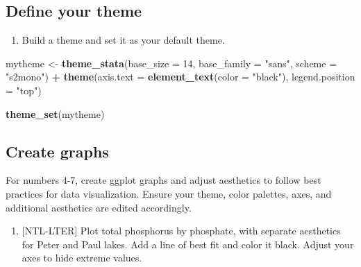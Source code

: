 \documentclass[]{article}
\newenvironment{Shaded}{\begin{snugshade}}{\end{snugshade}}
\newcommand{\DataTypeTok}[1]{\textcolor[rgb]{0.13,0.29,0.53}{#1}}
\newcommand{\DecValTok}[1]{\textcolor[rgb]{0.00,0.00,0.81}{#1}}
\newcommand{\KeywordTok}[1]{\textcolor[rgb]{0.13,0.29,0.53}{\textbf{#1}}}
\newcommand{\NormalTok}[1]{#1}
\newcommand{\OperatorTok}[1]{\textcolor[rgb]{0.81,0.36,0.00}{\textbf{#1}}}
\newcommand{\StringTok}[1]{\textcolor[rgb]{0.31,0.60,0.02}{#1}}
\providecommand{\tightlist}{%
  \setlength{\itemsep}{0pt}\setlength{\parskip}{0pt}}
\begin{document}
\hypertarget{define-your-theme}{%
\subsection{Define your theme}\label{define-your-theme}}

\begin{enumerate}
\def\labelenumi{\arabic{enumi}.}
\setcounter{enumi}{2}
\tightlist
\item
  Build a theme and set it as your default theme.
\end{enumerate}

\begin{Shaded}
\begin{Highlighting}[]
\NormalTok{mytheme <-}\StringTok{ }\KeywordTok{theme_stata}\NormalTok{(}\DataTypeTok{base_size =} \DecValTok{14}\NormalTok{, }\DataTypeTok{base_family =} \StringTok{"sans"}\NormalTok{, }\DataTypeTok{scheme =} \StringTok{"s2mono"}\NormalTok{) }\OperatorTok{+}
\StringTok{  }\KeywordTok{theme}\NormalTok{(}\DataTypeTok{axis.text =} \KeywordTok{element_text}\NormalTok{(}\DataTypeTok{color =} \StringTok{"black"}\NormalTok{), }
        \DataTypeTok{legend.position =} \StringTok{"top"}\NormalTok{)}

\KeywordTok{theme_set}\NormalTok{(mytheme)}
\end{Highlighting}
\end{Shaded}

\hypertarget{create-graphs}{%
\subsection{Create graphs}\label{create-graphs}}

For numbers 4-7, create ggplot graphs and adjust aesthetics to follow
best practices for data visualization. Ensure your theme, color
palettes, axes, and additional aesthetics are edited accordingly.

\begin{enumerate}
\def\labelenumi{\arabic{enumi}.}
\setcounter{enumi}{3}
\tightlist
\item
  {[}NTL-LTER{]} Plot total phosphorus by phosphate, with separate
  aesthetics for Peter and Paul lakes. Add a line of best fit and color
  it black. Adjust your axes to hide extreme values.
\end{enumerate}
\end{document}
